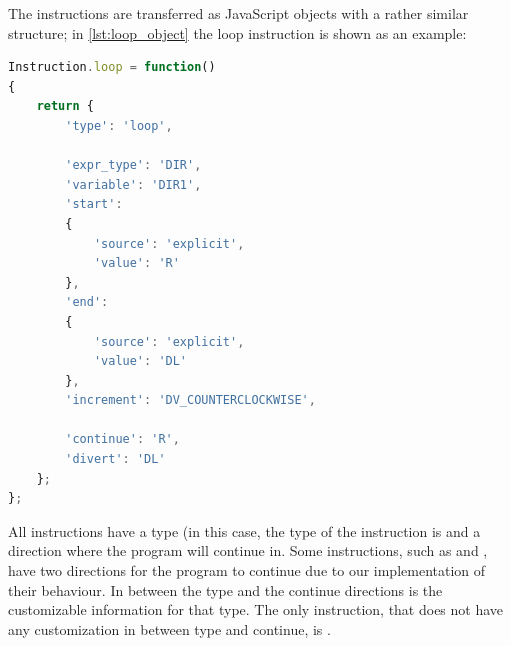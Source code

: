 The instructions are transferred as JavaScript objects with a rather similar structure; in \autoref{lst:loop_object} the loop instruction is shown as an example:

\begin{lstlisting}[language=javascript, caption=Loop Object, label=lst:loop_object]
Instruction.loop = function()
{
	return {
		'type': 'loop',

		'expr_type': 'DIR',
		'variable': 'DIR1',
		'start':
		{
			'source': 'explicit',
			'value': 'R'
		},
		'end':
		{
			'source': 'explicit',
			'value': 'DL'
		},
		'increment': 'DV_COUNTERCLOCKWISE',
		
		'continue': 'R',
		'divert': 'DL'
	};
};
\end{lstlisting}

All instructions have a type (in this case, the type of the instruction is  and a direction where the program will continue in.
Some instructions, such as  and , have two directions for the program to continue due to our implementation of their behaviour.
In between the type and the continue directions is the customizable information for that type.
The only instruction, that does not have any customization in between type and continue, is .